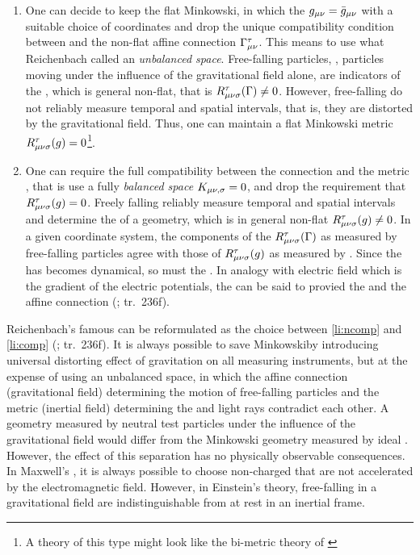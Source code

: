 \documentclass[submitted]{article}
\renewcommand{\Mink}{Minkowski\xspace}
\renewcommand{\rzlp}[2]{(\cite[#1]{Reichenbach1928}; tr.\ #2)\xspace}
\begin{document}
\begin{enumerate}[label=(\alph*)] 
 \item \label{li:ncomp} One can decide to keep the flat \Mink \spti, in which the $g_{\mu\nu}=\bar{g}_{\mu\nu}$ with a suitable choice of coordinates and drop the unique compatibility condition between \gmn and the non-flat affine connection $\Gamma^\tau_{\mu\nu}$. This means to use what Reichenbach called an \emph{unbalanced space}. Free-falling particles, \thatis, particles moving under the influence of the gravitational field alone, are indicators of the \Gtmn, which is general non-flat, that is $R_{\mu \nu \sigma}^{\tau}(\Gamma) \neq 0$. However, free-falling \rac do not reliably measure temporal and spatial intervals, that is, they are distorted by the gravitational field. Thus, one can maintain a flat \Mink metric $R_{\mu \nu \sigma}^{\tau} (g)=0$\footnote{A theory of this type might look like the bi-metric theory of \cite{Rosen1940,Rosen1940a}}.
 
\item \label{li:comp} One can require the full compatibility between the connection \Gtmn and the metric \gmn, that is use a fully \emph{balanced space} $K_{\mu \nu, \sigma} = 0$, and drop the requirement that $R_{\mu \nu \sigma}^{\tau} (g)=0$. Freely falling \rac reliably measure temporal and spatial intervals and determine the \gmn of a geometry, which is in general non-flat $R_{\mu \nu \sigma}^{\tau} (g) \neq 0$. In a given coordinate system, the components of the $R_{\mu \nu \sigma}^{\tau}(\Gamma)$ as measured by free-falling particles agree with those of $R_{\mu \nu \sigma}^{\tau} (g)$ as measured by \rac. Since the \Gtmn has becomes dynamical, so must the \gmn. In analogy with electric field which is the gradient of the electric potentials, the \gmn can be said to provied the  and the affine connection  \rzlp{271f}{236f}.
\end{enumerate}
%
Reichenbach's famous  can be reformulated as the choice between \cref{li:ncomp} and \cref{li:comp} \rzlp{271f}{236f}. It is always possible to save \Mink \spti by introducing universal distorting effect of gravitation on all measuring instruments, but at the expense of using an unbalanced space, in which the affine connection (gravitational field) determining the motion of free-falling particles and the metric (inertial field) determining the \rac and light rays contradict each other. A  geometry measured by neutral test particles under the influence of the gravitational field would differ from the  \Mink geometry measured by ideal \rac \citep{Stachel2007}. However, the effect of this separation has no physically observable consequences. In Maxwell's \ed, it is always possible to choose non-charged \rac that are not accelerated by the electromagnetic field. However, in Einstein's theory, \rac free-falling in a gravitational field are indistinguishable from \rac at rest in an inertial frame.
\end{document}
